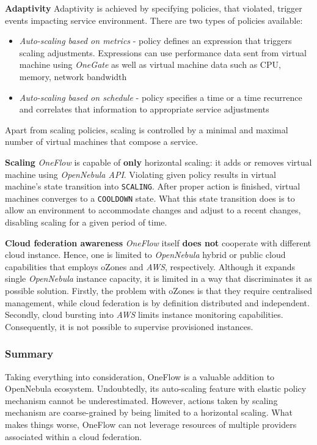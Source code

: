 \begin{asparaenum}

\item[\textbf{Adaptivity}]
Adaptivity is achieved by specifying policies, that violated, trigger events impacting service environment. There are two types of policies available:
\begin{itemize}
 \item \emph{Auto-scaling based on metrics} - policy defines an expression that triggers scaling adjustments. Expressions can use performance data sent from virtual machine using \emph{OneGate} as well as virtual machine data such as CPU, memory, network bandwidth
 \item \emph{Auto-scaling based on schedule} - policy specifies a time or a time recurrence and correlates that information to appropriate service adjustments
\end{itemize}

Apart from scaling policies, scaling is controlled by a minimal and maximal number of virtual machines that compose a service.

\item[\textbf{Scaling}]
\emph{OneFlow} is capable of \textbf{only} horizontal scaling: it adds or removes virtual machine using \emph{OpenNebula API}. Violating given policy results in virtual machine's state transition into \texttt{SCALING}. After proper action is finished, virtual machines converges to a \texttt{COOLDOWN} state. What this state transition does is to allow an environment to accommodate changes and adjust to a recent changes, disabling scaling for a given period of time.


\item[\textbf{Cloud federation awareness}]
\emph{OneFlow} itself \textbf{does not} cooperate with different cloud instance. Hence, one is limited to \emph{OpenNebula} hybrid or public cloud capabilities that employs oZones and \emph{AWS}, respectively. Although it expands single \emph{OpenNebula} instance capacity, it is limited in a way that discriminates it as possible solution. Firstly, the problem with oZones is that they require centralised management, while cloud federation is by definition distributed and independent. Secondly, cloud bursting into \emph{AWS} limits instance monitoring capabilities. Consequently, it is not possible to supervise provisioned instances.
\end{asparaenum}

\subsubsection{Summary}
Taking everything into consideration, OneFlow is a valuable addition to OpenNebula ecosystem. Undoubtedly, its auto-scaling feature with elastic policy mechanism cannot be underestimated. However, actions taken by scaling mechanism are coarse-grained by being limited to a horizontal scaling. What makes things worse, OneFlow can not leverage resources of multiple providers associated within a cloud federation.

